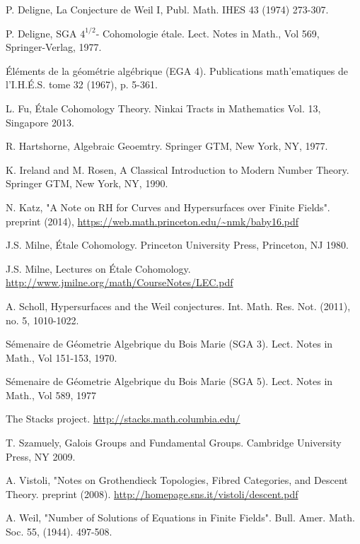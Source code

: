 \documentclass{ucbthesis}
\theoremstyle{definition}
\theoremstyle{theorem}
\begin{document}
\begin{thebibliography}{15}

\bibitem[Deligne]{} P. Deligne, La Conjecture de Weil I, Publ. Math. IHES 43 (1974) 273-307. 

\bibitem [SGA $4^{1/2}$]{} P. Deligne, SGA $4^{1/2}$- Cohomologie \'{e}tale. Lect. Notes in Math., Vol 569, Springer-Verlag, 1977. 

\bibitem [EGA 4]{} \'{E}l\'{e}ments de la g\'{e}om\'{e}trie alg\'{e}brique (EGA 4). Publications math'{e}matiques de l'I.H.\'{E}.S. tome 32 (1967), p. 5-361.  

\bibitem[Fu]{} L. Fu, \'{E}tale Cohomology Theory. Ninkai Tracts in Mathematics Vol. 13, Singapore 2013. 

\bibitem[Hartshorne]{} R. Hartshorne, Algebraic Geoemtry. Springer GTM, New York, NY, 1977.

 K. Ireland and M. Rosen, A Classical Introduction to Modern Number Theory. Springer GTM, New York, NY, 1990. 

\bibitem[Katz]{} N. Katz, "A Note on RH for Curves and Hypersurfaces over Finite Fields". preprint (2014),
\url{https://web.math.princeton.edu/~nmk/baby16.pdf}

\bibitem[Milne EC]{} J.S. Milne, \'{E}tale Cohomology. Princeton University Press, Princeton, NJ 1980. 

 J.S. Milne, Lectures on \'{E}tale Cohomology.  \url{http://www.jmilne.org/math/CourseNotes/LEC.pdf}

\bibitem [Scholl]{} A. Scholl, Hypersurfaces and the Weil conjectures. Int. Math. Res. Not. (2011), no. 5,
1010-1022.

\bibitem [SGA 3]{} S\'{e}menaire de G\'{e}ometrie Algebrique du Bois Marie (SGA 3). Lect. Notes in Math., Vol 151-153, 1970. 

\bibitem [SGA 5]{} S\'{e}menaire de G\'{e}ometrie Algebrique du Bois Marie (SGA 5). Lect. Notes in Math., Vol 589, 1977

\bibitem[Stacks]{} The Stacks project. \url{http://stacks.math.columbia.edu/}

\bibitem[Szamuely]{} T. Szamuely, Galois Groups and Fundamental Groups. Cambridge University Press, NY 2009. 

\bibitem [Vistoli]{} A. Vistoli, "Notes on Grothendieck Topologies, Fibred Categories, and Descent Theory. preprint (2008). \url{http://homepage.sns.it/vistoli/descent.pdf}

\bibitem[Weil]{} A. Weil, "Number of Solutions of Equations in Finite Fields". Bull. Amer. Math. Soc. 55, (1944). 497-508. 


\end{thebibliography}
\end{document}
